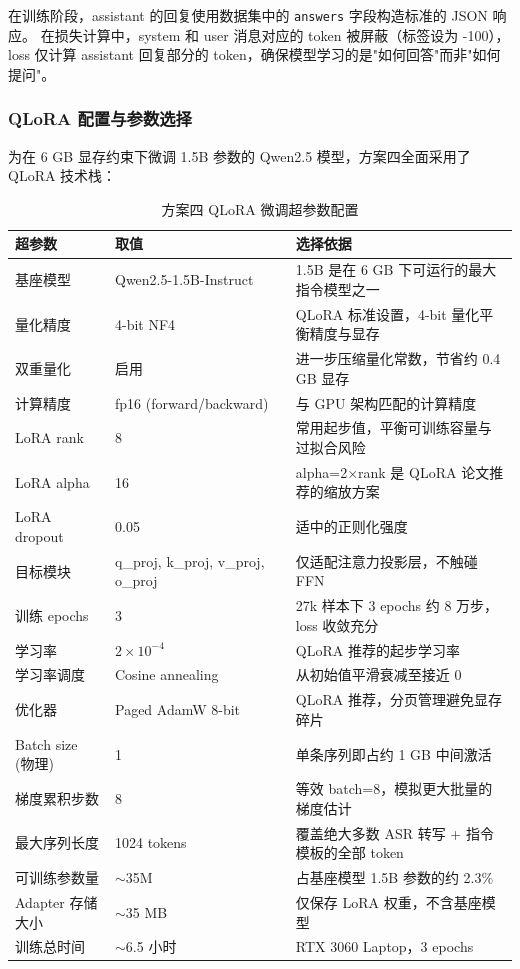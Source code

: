 \documentclass[11pt,a4paper]{ctexart}
\begin{document}
在训练阶段，assistant 的回复使用数据集中的 \texttt{answers} 字段构造标准的 JSON 响应。
在损失计算中，system 和 user 消息对应的 token 被屏蔽（标签设为 -100），
loss 仅计算 assistant 回复部分的 token，确保模型学习的是"如何回答"而非"如何提问"。

\subsubsection{QLoRA 配置与参数选择}

为在 6 GB 显存约束下微调 1.5B 参数的 Qwen2.5 模型，方案四全面采用了 QLoRA 技术栈：

\begin{table}[H]\centering
\caption{方案四 QLoRA 微调超参数配置}
\label{tab:qlora}
\begin{tabular}{@{}lll@{}}\toprule
\textbf{超参数} & \textbf{取值} & \textbf{选择依据}\\\midrule
基座模型 & Qwen2.5-1.5B-Instruct & 1.5B 是在 6 GB 下可运行的最大指令模型之一\\
量化精度 & 4-bit NF4 & QLoRA 标准设置，4-bit 量化平衡精度与显存\\
双重量化 & 启用 & 进一步压缩量化常数，节省约 0.4 GB 显存\\
计算精度 & fp16 (forward/backward) & 与 GPU 架构匹配的计算精度\\
LoRA rank & 8 & 常用起步值，平衡可训练容量与过拟合风险\\
LoRA alpha & 16 & alpha=2$\times$rank 是 QLoRA 论文推荐的缩放方案\\
LoRA dropout & 0.05 & 适中的正则化强度\\
目标模块 & q\_proj, k\_proj, v\_proj, o\_proj & 仅适配注意力投影层，不触碰 FFN\\
训练 epochs & 3 & 27k 样本下 3 epochs 约 8 万步，loss 收敛充分\\
学习率 & $2 \times 10^{-4}$ & QLoRA 推荐的起步学习率\\
学习率调度 & Cosine annealing & 从初始值平滑衰减至接近 0\\
优化器 & Paged AdamW 8-bit & QLoRA 推荐，分页管理避免显存碎片\\
Batch size (物理) & 1 & 单条序列即占约 1 GB 中间激活\\
梯度累积步数 & 8 & 等效 batch=8，模拟更大批量的梯度估计\\
最大序列长度 & 1024 tokens & 覆盖绝大多数 ASR 转写 + 指令模板的全部 token\\
\midrule
可训练参数量 & $\sim$35M & 占基座模型 1.5B 参数的约 2.3\%\\
Adapter 存储大小 & $\sim$35 MB & 仅保存 LoRA 权重，不含基座模型\\
训练总时间 & $\sim$6.5 小时 & RTX 3060 Laptop，3 epochs\\\bottomrule
\end{tabular}
\end{table}
\end{document}
